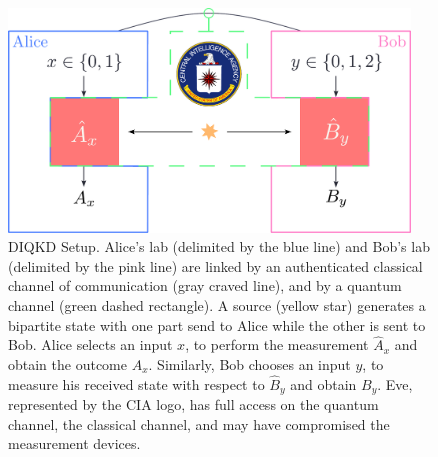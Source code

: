 \begin{figure}
	\begin{center}
		\includegraphics[width=0.95\textwidth]{chapters/deviceindependent/img/setup.pdf}
	\end{center}
	\caption{DIQKD Setup. 
		Alice's lab (delimited by the blue line) and Bob's lab (delimited by the pink line) are linked by an authenticated classical channel of communication (gray craved line), and by a quantum channel (green dashed rectangle). 
		A source (yellow star) generates a bipartite state with one part send to Alice while the other is sent to Bob. 
		Alice selects an input $x$, to perform the measurement $\hat{A}_x$ and obtain the outcome $A_x$. 
		Similarly, Bob chooses an input $y$, to measure his received state with respect to $\hat{B}_y$ and obtain $B_y$.
		Eve, represented by the CIA logo, has full access on the quantum channel, the classical channel, and may have compromised the measurement devices. }
	\label{fig:DIQKD_setup}
\end{figure}
